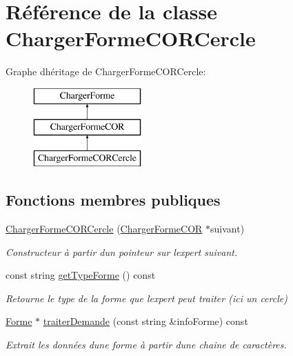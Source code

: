 \hypertarget{class_charger_forme_c_o_r_cercle}{}\section{Référence de la classe Charger\+Forme\+C\+O\+R\+Cercle}
\label{class_charger_forme_c_o_r_cercle}
Graphe d\textquotesingle{}héritage de Charger\+Forme\+C\+O\+R\+Cercle\+:\begin{figure}[H]
\begin{center}
\leavevmode
\includegraphics[height=3.000000cm]{class_charger_forme_c_o_r_cercle}
\end{center}
\end{figure}
\subsection*{Fonctions membres publiques}
\begin{DoxyCompactItemize}
\item 
\mbox{\hyperlink{class_charger_forme_c_o_r_cercle_aa014ab64f0a6c59c9e6d0148ec889e23}{Charger\+Forme\+C\+O\+R\+Cercle}} (\mbox{\hyperlink{class_charger_forme_c_o_r}{Charger\+Forme\+C\+OR}} $\ast$suivant)
\begin{DoxyCompactList}\small\item\em Constructeur à partir d\textquotesingle{}un pointeur sur l\textquotesingle{}expert suivant. \end{DoxyCompactList}\item 
const string \mbox{\hyperlink{class_charger_forme_c_o_r_cercle_a4ca5a036a26641c2636d376f51659172}{get\+Type\+Forme}} () const
\begin{DoxyCompactList}\small\item\em Retourne le type de la forme que l\textquotesingle{}expert peut traiter (ici un cercle) \end{DoxyCompactList}\item 
\mbox{\hyperlink{class_forme}{Forme}} $\ast$ \mbox{\hyperlink{class_charger_forme_c_o_r_cercle_ad65cbf0176ef4a65b44c5782646e45fa}{traiter\+Demande}} (const string \&info\+Forme) const
\begin{DoxyCompactList}\small\item\em Extrait les données d\textquotesingle{}une forme à partir d\textquotesingle{}une chaine de caractères. \end{DoxyCompactList}\end{DoxyCompactItemize}
